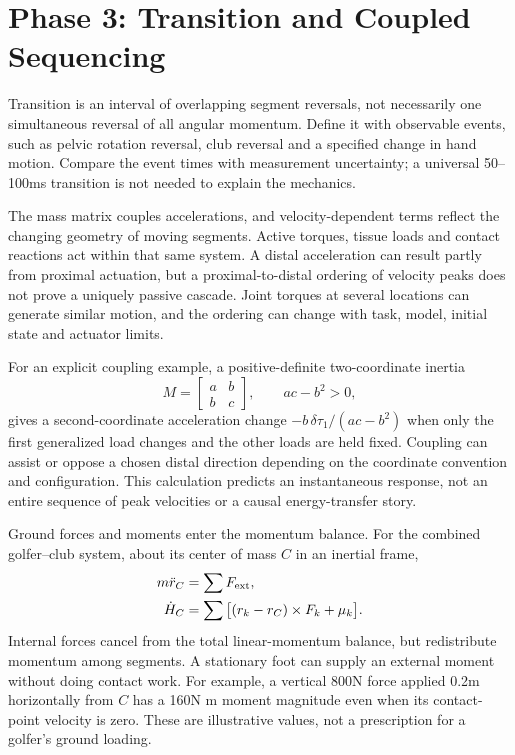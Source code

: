 \section{Phase 3: Transition and Coupled Sequencing}

Transition is an interval of overlapping segment reversals, not necessarily one simultaneous reversal of all angular momentum. Define it with observable events, such as pelvic rotation reversal, club reversal and a specified change in hand motion. Compare the event times with measurement uncertainty; a universal 50--100ms transition is not needed to explain the mechanics.

The mass matrix couples accelerations, and velocity-dependent terms reflect the changing geometry of moving segments. Active torques, tissue loads and contact reactions act within that same system. A distal acceleration can result partly from proximal actuation, but a proximal-to-distal ordering of velocity peaks does not prove a uniquely passive cascade. Joint torques at several locations can generate similar motion, and the ordering can change with task, model, initial state and actuator limits.

For an explicit coupling example, a positive-definite two-coordinate inertia
\begin{equation}
M=\begin{bmatrix}a&b\\b&c\end{bmatrix},\qquad ac-b^2>0,
\label{eq:complete_coupling}
\end{equation}
gives a second-coordinate acceleration change $-b\,\delta\tau_1/(ac-b^2)$ when only the first generalized load changes and the other loads are held fixed. Coupling can assist or oppose a chosen distal direction depending on the coordinate convention and configuration. This calculation predicts an instantaneous response, not an entire sequence of peak velocities or a causal energy-transfer story.

Ground forces and moments enter the momentum balance. For the combined golfer--club system, about its center of mass $C$ in an inertial frame,
\begin{equation}
\begin{aligned}
m\ddot r_C&=\sum F_{\rm ext},\\
\dot H_C&=\sum\big[(r_k-r_C)\times F_k+\mu_k\big].
\end{aligned}
\label{eq:complete_momentum}
\end{equation}
Internal forces cancel from the total linear-momentum balance, but redistribute momentum among segments. A stationary foot can supply an external moment without doing contact work. For example, a vertical 800N force applied 0.2m horizontally from $C$ has a 160N m moment magnitude even when its contact-point velocity is zero. These are illustrative values, not a prescription for a golfer's ground loading.

